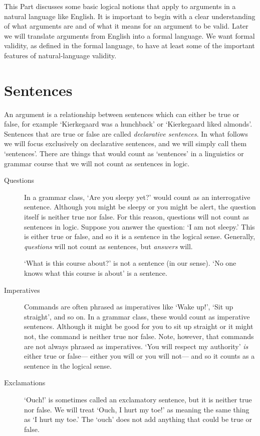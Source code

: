 
This Part discusses some basic logical notions that apply to arguments in a natural language like English. It is important to begin with a clear understanding of what arguments are and of what it means for an argument to be valid. Later we will translate arguments from English into a formal language. We want formal validity, as defined in the formal language, to have at least some of the important features of natural-language validity. 


\section{Sentences}
\label{intro.sentences}

An argument is a relationship between sentences which can either be true or false, for example `Kierkegaard was a hunchback' or `Kierkegaard liked almonds'. Sentences that are true or false are called \emph{declarative sentences}. In what follows we will focus exclusively on declarative sentences, and we will simply call them `sentences'. There are things that would count as `sentences' in a linguistics or grammar course that we will not count as sentences in logic.

\begin{description}
\item[{Questions}] In a grammar class, `Are you sleepy yet?' would count as an interrogative sentence. Although you might be sleepy or you might be alert, the question itself is neither true nor false. For this reason, questions will not count as sentences in logic. Suppose you answer the question: `I am not sleepy.' This is either true or false, and so it is a sentence in the logical sense. Generally, \emph{questions} will not count as sentences, but \emph{answers} will. 

`What is this course about?' is not a sentence (in our sense). `No one knows what this course is about' is a sentence.

\item[{Imperatives}] Commands are often phrased as imperatives like `Wake up!', `Sit up straight', and so on. In a grammar class, these would count as imperative sentences. Although it might be good for you to sit up straight or it might not, the command is neither true nor false. Note, however, that commands are not always phrased as imperatives. `You will respect my authority' \emph{is} either true or false--- either you will or you will not--- and so it counts as a sentence in the logical sense.

\item[{Exclamations}] `Ouch!' is sometimes called an exclamatory sentence, but it is neither true nor false. We will treat `Ouch, I hurt my toe!' as meaning the same thing as `I hurt my toe.' The `ouch' does not add anything that could be true or false.
\end{description}

